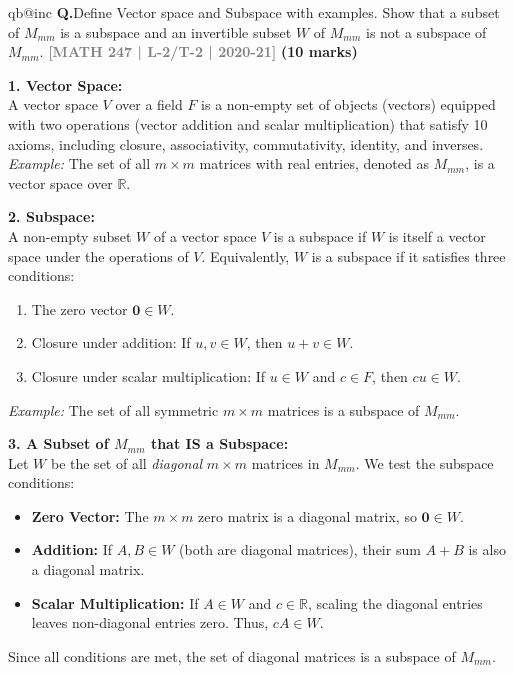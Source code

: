 \documentclass[12pt,a3paper]{article}
\makeatletter
\newcommand{\yr}[1]{\hfill\textcolor{gray}{\small\textbf{[#1]}}}
\newcommand{\mk}[1]{\textcolor{orange!70!black}{\small\textbf{(#1 marks)}}}
\newcounter{qnum}
\newcommand{\Q}[1]{%
  \csname qb@inc\endcsname
  \needspace{4\baselineskip}
  \refstepcounter{qnum}
  \vspace{6pt}
  \noindent\textbf{Q\theqnum.}\enspace #1\par
}
\makeatother
\begin{document}
\Q{Define Vector space and Subspace with examples. Show that a subset of $M_{mm}$ is a subspace and an invertible subset $W$ of $M_{mm}$ is not a subspace of $M_{mm}$.
\yr{MATH 247 | L-2/T-2 | 2020-21} \mk{10}}

\begin{tcolorbox}[enhanced,breakable,
  colback=cC!4,colframe=cC,boxrule=0.8pt,arc=5pt,
  title={\textbf{Answer --- Q118: Vector Space, Subspace \& Subsets of $M_{mm}$}},
  fonttitle=\bfseries\color{white},colbacktitle=cC]

\textbf{1. Vector Space:} \\
A vector space $V$ over a field $F$ is a non-empty set of objects (vectors) equipped with two operations (vector addition and scalar multiplication) that satisfy 10 axioms, including closure, associativity, commutativity, identity, and inverses. \\
\textit{Example:} The set of all $m \times m$ matrices with real entries, denoted as $M_{mm}$, is a vector space over $\mathbb{R}$.

\vspace{3mm}
\textbf{2. Subspace:} \\
A non-empty subset $W$ of a vector space $V$ is a subspace if $W$ is itself a vector space under the operations of $V$. Equivalently, $W$ is a subspace if it satisfies three conditions:
\begin{enumerate}
    \item The zero vector $\mathbf{0} \in W$.
    \item Closure under addition: If $u, v \in W$, then $u + v \in W$.
    \item Closure under scalar multiplication: If $u \in W$ and $c \in F$, then $cu \in W$.
\end{enumerate}
\textit{Example:} The set of all symmetric $m \times m$ matrices is a subspace of $M_{mm}$.

\vspace{3mm}
\textbf{3. A Subset of $M_{mm}$ that IS a Subspace:} \\
Let $W$ be the set of all \textit{diagonal} $m \times m$ matrices in $M_{mm}$. We test the subspace conditions:
\begin{itemize}
    \item \textbf{Zero Vector:} The $m \times m$ zero matrix is a diagonal matrix, so $\mathbf{0} \in W$.
    \item \textbf{Addition:} If $A, B \in W$ (both are diagonal matrices), their sum $A + B$ is also a diagonal matrix.
    \item \textbf{Scalar Multiplication:} If $A \in W$ and $c \in \mathbb{R}$, scaling the diagonal entries leaves non-diagonal entries zero. Thus, $cA \in W$.
\end{itemize}
Since all conditions are met, the set of diagonal matrices is a subspace of $M_{mm}$.


\end{tcolorbox}
\end{document}
